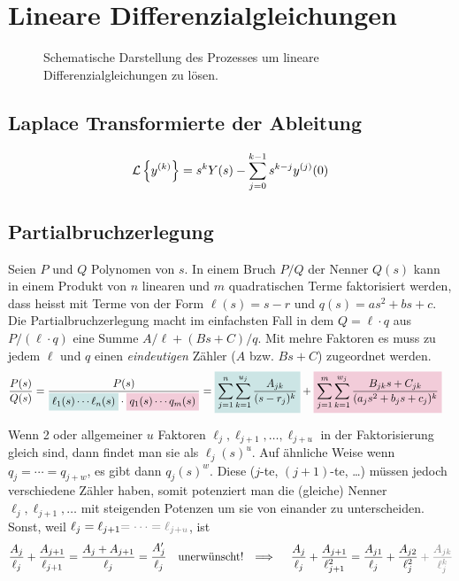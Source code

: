 \section{Lineare Differenzialgleichungen}
\begin{figure}[H] \centering
  
  \caption{
    Schematische Darstellung des Prozesses um lineare Differenzialgleichungen
    zu l\"osen.
  }
\end{figure}

\subsection{Laplace Transformierte der Ableitung}
\[
  \mathcal{L}\left\{ y^{(k)} \right\} =
  s^k Y(s) - \sum_{j = 0}^{k - 1} s^{k-j} y^{(j)}(0)
\]

\subsection{Partialbruchzerlegung}
Seien \(P\) und \(Q\) Polynomen von \(s\). In einem Bruch \(P/Q\)
der Nenner \(Q(s)\) kann in einem Produkt von \(n\) linearen und \(m\)
quadratischen Terme faktorisiert werden, dass heisst mit Terme von der Form
\(\ell (s) = s - r\) und \(q(s) = a s^2 + b s + c\).
%
Die Partialbruchzerlegung macht im einfachsten Fall in dem \(Q = \ell\cdot q\)
aus \(P/(\ell \cdot q)\) eine Summe \(A/\ell + (Bs + C)/q\). Mit mehre Faktoren
es muss zu jedem \(\ell\) und \(q\) einen \emph{eindeutigen} Z\"ahler (\(A\)
bzw. \(Bs + C\)) zugeordnet werden.
%
\begin{align*}
  \frac{P(s)}{Q(s)}
  =
  \frac{P(s)}{
    \colorbox{teal!20}{\(
      \ell_1(s)\cdots \ell_n(s)
    \)}
    \cdot
    \colorbox{purple!20}{\(
      q_1(s)\cdots q_m(s)
    \)}
  }
  &=
  \colorbox{teal!20}{\(\displaystyle
    \sum_{j=1}^n \sum_{k=1}^{u_j} \frac{A_{jk}}{(s - r_j)^k}
  \)}
  +
  \colorbox{purple!20}{\(\displaystyle
    \sum_{j=1}^m \sum_{k=1}^{w_j} \frac{B_{jk} s + C_{jk}}{(a_j s^2 + b_j s + c_j)^k}
  \)}
\end{align*}

Wenn 2 oder allgemeiner \(u\) Faktoren \(\ell_j, \ell_{j+1},\dots,\ell_{j+u}\)
in der Faktorisierung gleich sind, dann findet man sie als \(\ell_j(s)^{u}\).
Auf \"ahnliche Weise wenn \(q_j = \cdots = q_{j+w}\), es gibt dann
\(q_j(s)^{w}\).
%
Diese (\(j\)-te, \((j+1)\)-te, \dots) m\"ussen jedoch verschiedene Z\"ahler haben,
somit potenziert man die (gleiche) Nenner \(\ell_j, \ell_{j+1}, \dots\) mit steigenden Potenzen 
um sie von einander zu unterscheiden.
Sonst, weil
\(\ell_j = \ell_{j+1} \textcolor{gray}{= \cdots = \ell_{j+u}}\), ist
\begin{align*}
  \frac{A_j}{\ell_j} + \frac{A_{j+1}}{\ell_{j+1}} =
    \frac{A_j + A_{j+1}}{\ell_j} = \frac{A'_j}{\ell_j}
  \quad\text{unerw\"unscht! }\implies\quad
  \frac{A_j}{\ell_j} + \frac{A_{j+1}}{\ell_{j+1}^2} =
    \frac{A_{j1}}{\ell_j} + \frac{A_{j2}}{\ell_j^2}
      \begingroup\color{gray}
        + \frac{A_{jk}}{\ell_j^k}
      \endgroup
\end{align*}


